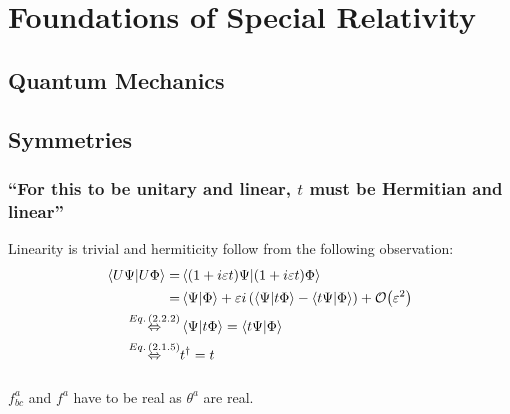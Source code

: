 \section{Foundations of Special Relativity}\label{sec:chapter2}

\subsection{Quantum Mechanics}\label{susec:2_1}

\subsection{Symmetries}\label{susec:2_2}
\subsubsection{\enquote{For this to be unitary and linear, $t$ must be Hermitian and linear} }\label{sususec:2_2_p51_1}
Linearity is trivial and hermiticity follow from the following observation:
\begin{align*} 
	\innerproduct{U\Psi}{U\Phi}=&\innerproduct{(1+i\varepsilon t) \Psi}{(1+i\varepsilon t) \Phi}\\
	=&\innerproduct{\Psi}{\Phi}+\varepsilon i\left(\innerproduct{\Psi}{t \Phi}-\innerproduct{t\Psi}{ \Phi}\right)+\order{\varepsilon^2}\\
	\overset{\eq{2.2.2}}{\Leftrightarrow}&\innerproduct{\Psi}{t \Phi}=\innerproduct{t\Psi}{\Phi}\\
	\overset{\eq{2.1.5}}{\Leftrightarrow}&t^\dagger=t
\end{align*}

\subsubsection{ }
$f^a_{bc}$ and $f^a$ have to be real as $\theta^a$ are real.

